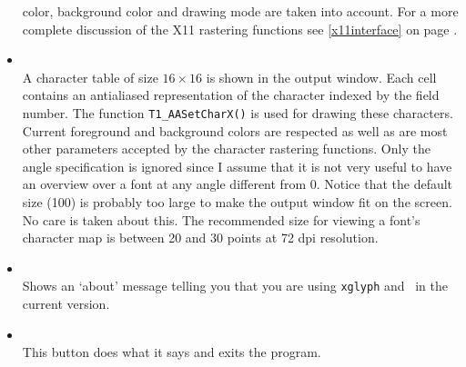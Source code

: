 \begin{itemize}
  color, background color and drawing mode are taken into account. For a more
  complete discussion of the X11 rastering functions see \ref{x11interface} on
  page \pageref{x11interface}. 
\item {}\\
  A character table of size $16 \times 16$ is shown in the output
  window. Each cell contains an antialiased representation of the character
  indexed by the field number. The function \verb+T1_AASetCharX()+ is
  used for drawing these characters. Current foreground and background colors
  are respected as well as are most other parameters accepted by the character
  rastering functions. Only the angle specification
  is ignored since I assume that it is not very useful to have an overview
  over a font at any angle different from 0. Notice that the default size
  (100) is probably too large to make the output window fit on the screen. No
  care is taken about this. The recommended size for viewing a font's
  character map is
  between 20 and 30 points at 72 dpi resolution.  
\item {}\\
  Shows an `about' message 
  telling you that you are using \verb+xglyph+ and \tonelib\ in the current
  version.
\item {}\\
  This button does what it says and exits the program.
\end{itemize}

